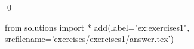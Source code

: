 
\begin{ex} 
  \label{ex:exercises1}
  
  \qed
\end{ex} 
\begin{python0}
from solutions import *
add(label="ex:exercises1",
    srcfilename='exercises/exercises1/answer.tex') 
\end{python0}

